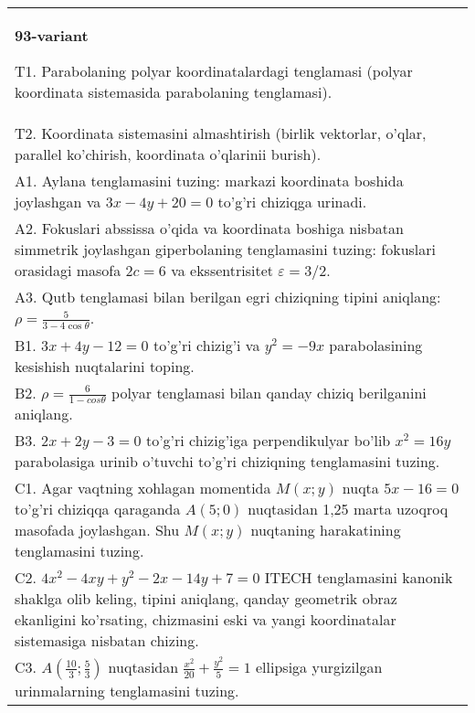 \documentclass{article}
\begin{document}
\begin{tabular}{m{17cm}}
\textbf{93-variant}
\newline

T1. Parabolaning polyar koordinatalardagi tenglamasi (polyar koordinata sistemasida parabolaning tenglamasi).\\

T2. Koordinata sistemasini almashtirish (birlik vektorlar, o'qlar, parallel ko'chirish, koordinata o'qlarinii burish).\\

A1. Aylana tenglamasini tuzing: markazi koordinata boshida joylashgan va $3x-4y+20=0$ to'g'ri chiziqga urinadi.\\

A2. Fokuslari abssissa o'qida va koordinata boshiga nisbatan simmetrik joylashgan giperbolaning tenglamasini tuzing: fokuslari orasidagi masofa $2c=6$ va ekssentrisitet $\varepsilon=3/2$.\\

A3. Qutb tenglamasi bilan berilgan egri chiziqning tipini aniqlang: $\rho=\frac{5}{3-4\cos\theta}$.\\

B1. $3x + 4y - 12 = 0$ to'g'ri chizig'i va $y^{2} = - 9x$ parabolasining kesishish nuqtalarini toping.\\

B2. $\rho = \frac{6}{1 - cos\theta}$ polyar tenglamasi bilan qanday chiziq berilganini aniqlang.  \\

B3. $2x + 2y - 3 = 0$ to'g'ri chizig'iga perpendikulyar bo'lib $x^{2} = 16y$ parabolasiga urinib o'tuvchi to'g'ri chiziqning tenglamasini tuzing.  \\

C1. Agar vaqtning xohlagan momentida $M(x;y)$ nuqta $5x - 16 = 0$ to'g'ri chiziqqa qaraganda $A(5;0)$ nuqtasidan 1,25 marta uzoqroq masofada joylashgan. Shu $M(x;y)$ nuqtaning harakatining tenglamasini tuzing.  \\

C2. $4x^{2} - 4xy + y^{2} - 2x - 14y + 7 = 0$ ITECH tenglamasini kanonik shaklga olib keling, tipini aniqlang, qanday geometrik obraz ekanligini ko'rsating, chizmasini eski va yangi koordinatalar sistemasiga nisbatan chizing.  \\

C3. $A(\frac{10}{3};\frac{5}{3})$ nuqtasidan $\frac{x^{2}}{20} + \frac{y^{2}}{5} = 1$ ellipsiga yurgizilgan urinmalarning tenglamasini tuzing.  \\

\end{tabular}
\vspace{1cm}
\end{document}
